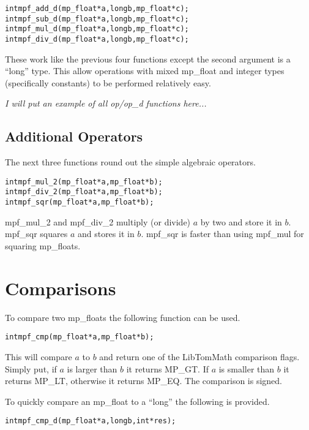 \documentclass[b5paper]{book}
\begin{document}
    
\begin{alltt}
int  mpf_add_d(mp_float *a, long b, mp_float *c);
int  mpf_sub_d(mp_float *a, long b, mp_float *c);
int  mpf_mul_d(mp_float *a, long b, mp_float *c);
int  mpf_div_d(mp_float *a, long b, mp_float *c);
\end{alltt}
These work like the previous four functions except the second argument is a ``long'' type.  This allow operations with 
mixed mp\_float and integer types (specifically constants) to be performed relatively easy.  

\textit{I will put an example of all op/op\_d functions here...}

\subsection{Additional Operators}
The next three functions round out the simple algebraic operators.

  
\begin{alltt}
int  mpf_mul_2(mp_float *a, mp_float *b);
int  mpf_div_2(mp_float *a, mp_float *b);
int  mpf_sqr(mp_float *a, mp_float *b);
\end{alltt}

mpf\_mul\_2 and mpf\_div\_2 multiply (or divide) $a$ by two and store it in $b$.  mpf\_sqr squares $a$ and stores it in $b$.  mpf\_sqr is
faster than using mpf\_mul for squaring mp\_floats.

\section{Comparisons}
To compare two mp\_floats the following function can be used.
\begin{alltt}
int  mpf_cmp(mp_float *a,   mp_float *b);
\end{alltt}
This will compare $a$ to $b$ and return one of the LibTomMath comparison flags.  Simply put, if $a$ is larger than $b$ it returns 
MP\_GT.  If $a$ is smaller than $b$ it returns MP\_LT, otherwise it returns MP\_EQ.  The comparison is signed.

To quickly compare an mp\_float to a ``long'' the following is provided.

\begin{alltt}
int  mpf_cmp_d(mp_float *a, long b, int *res);
\end{alltt}
\end{document}
